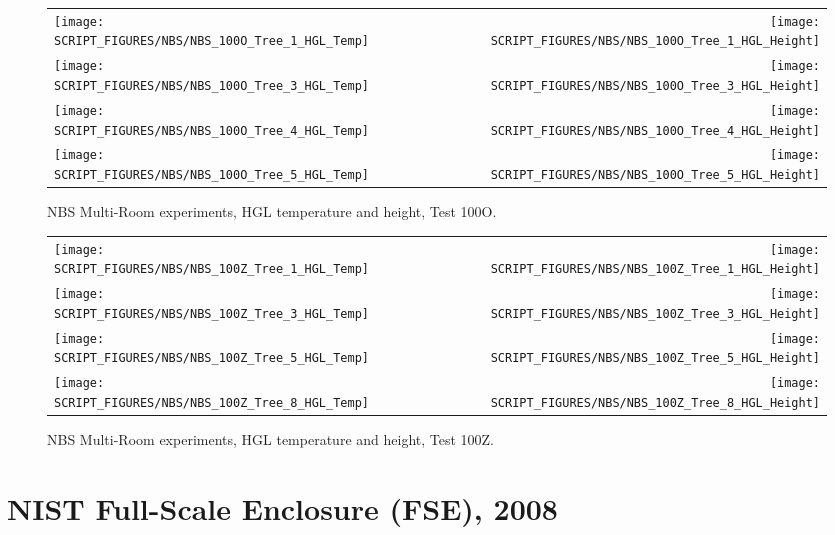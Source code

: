 \begin{figure}[p]
\begin{tabular*}{\textwidth}{l@{\extracolsep{\fill}}r}
\texttt{[image: SCRIPT\_FIGURES/NBS/NBS\_100O\_Tree\_1\_HGL\_Temp]} &
\texttt{[image: SCRIPT\_FIGURES/NBS/NBS\_100O\_Tree\_1\_HGL\_Height]} \\
\texttt{[image: SCRIPT\_FIGURES/NBS/NBS\_100O\_Tree\_3\_HGL\_Temp]} &
\texttt{[image: SCRIPT\_FIGURES/NBS/NBS\_100O\_Tree\_3\_HGL\_Height]} \\
\texttt{[image: SCRIPT\_FIGURES/NBS/NBS\_100O\_Tree\_4\_HGL\_Temp]} &
\texttt{[image: SCRIPT\_FIGURES/NBS/NBS\_100O\_Tree\_4\_HGL\_Height]} \\
\texttt{[image: SCRIPT\_FIGURES/NBS/NBS\_100O\_Tree\_5\_HGL\_Temp]} &
\texttt{[image: SCRIPT\_FIGURES/NBS/NBS\_100O\_Tree\_5\_HGL\_Height]}
\end{tabular*}
\caption[NBS Multi-Room experiments, HGL temperature and height, Test 100O]
{NBS Multi-Room experiments, HGL temperature and height, Test 100O.}
\label{NBS_HGL_2}
\end{figure}

\begin{figure}[p]
\begin{tabular*}{\textwidth}{l@{\extracolsep{\fill}}r}
\texttt{[image: SCRIPT\_FIGURES/NBS/NBS\_100Z\_Tree\_1\_HGL\_Temp]} &
\texttt{[image: SCRIPT\_FIGURES/NBS/NBS\_100Z\_Tree\_1\_HGL\_Height]} \\
\texttt{[image: SCRIPT\_FIGURES/NBS/NBS\_100Z\_Tree\_3\_HGL\_Temp]} &
\texttt{[image: SCRIPT\_FIGURES/NBS/NBS\_100Z\_Tree\_3\_HGL\_Height]} \\
\texttt{[image: SCRIPT\_FIGURES/NBS/NBS\_100Z\_Tree\_5\_HGL\_Temp]} &
\texttt{[image: SCRIPT\_FIGURES/NBS/NBS\_100Z\_Tree\_5\_HGL\_Height]} \\
\texttt{[image: SCRIPT\_FIGURES/NBS/NBS\_100Z\_Tree\_8\_HGL\_Temp]} &
\texttt{[image: SCRIPT\_FIGURES/NBS/NBS\_100Z\_Tree\_8\_HGL\_Height]}
\end{tabular*}
\caption[NBS Multi-Room experiments, HGL temperature and height, Test 100Z]
{NBS Multi-Room experiments, HGL temperature and height, Test 100Z.}
\label{NBS_HGL_3}
\end{figure}

\clearpage

\section{NIST Full-Scale Enclosure (FSE), 2008}

